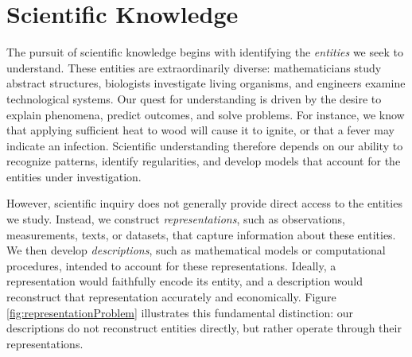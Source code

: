 %
%

\section{Scientific Knowledge}

The pursuit of scientific knowledge begins with identifying the \emph{entities} we seek to understand. These entities are extraordinarily diverse: mathematicians study abstract structures, biologists investigate living organisms, and engineers examine technological systems. Our quest for understanding is driven by the desire to explain phenomena, predict outcomes, and solve problems. For instance, we know that applying sufficient heat to wood will cause it to ignite, or that a fever may indicate an infection. Scientific understanding therefore depends on our ability to recognize patterns, identify regularities, and develop models that account for the entities under investigation.

However, scientific inquiry does not generally provide direct access to the entities we study. Instead, we construct \emph{representations}, such as observations, measurements, texts, or datasets, that capture information about these entities. We then develop \emph{descriptions}, such as mathematical models or computational procedures, intended to account for these representations. Ideally, a representation would faithfully encode its entity, and a description would reconstruct that representation accurately and economically. Figure \ref{fig:representationProblem} illustrates this fundamental distinction: our descriptions do not reconstruct entities directly, but rather operate through their representations.

% 

